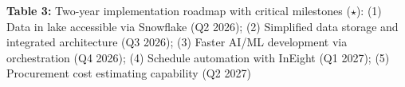 \documentclass[12pt, a4paper]{article}
\begin{document}
\vspace{0.5em}
\noindent\textbf{Table 3:} Two-year implementation roadmap with critical milestones ($\star$): (1) Data in lake accessible via Snowflake (Q2 2026); (2) Simplified data storage and integrated architecture (Q3 2026); (3) Faster AI/ML development via orchestration (Q4 2026); (4) Schedule automation with InEight (Q1 2027); (5) Procurement cost estimating capability (Q2 2027)
\vspace{1em}
\end{document}
